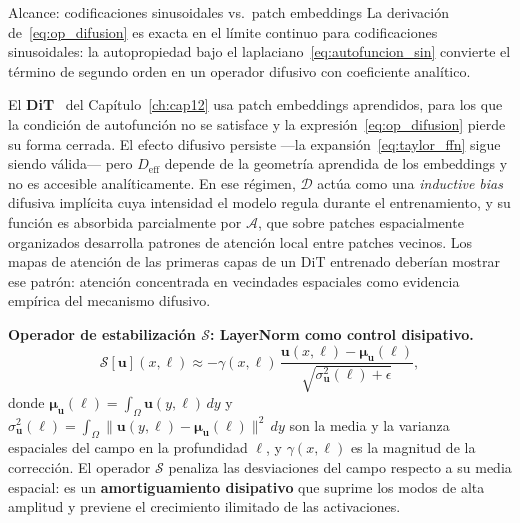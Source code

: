 \begin{observacion}{Alcance: codificaciones sinusoidales
vs.\ patch embeddings}
\label{obs:difusion_alcance}
La derivación de~\eqref{eq:op_difusion} es exacta en el límite
continuo para codificaciones sinusoidales: la autopropiedad
bajo el laplaciano~\eqref{eq:autofuncion_sin} convierte el
término de segundo orden en un operador difusivo con coeficiente
analítico.

El \textbf{DiT}~\cite{peebles2023dit} del Capítulo~\ref{ch:cap12}
usa patch embeddings aprendidos, para los que la condición de
autofunción no se satisface y la expresión~\eqref{eq:op_difusion}
pierde su forma cerrada. El efecto difusivo persiste
—la expansión~\eqref{eq:taylor_ffn} sigue siendo válida— pero
$D_{\mathrm{eff}}$ depende de la geometría aprendida de los
embeddings y no es accesible analíticamente. En ese régimen,
$\mathcal{D}$ actúa como una \emph{inductive bias} difusiva
implícita cuya intensidad el modelo regula durante el
entrenamiento, y su función es absorbida parcialmente por
$\mathcal{A}$, que sobre patches espacialmente organizados
desarrolla patrones de atención local entre patches vecinos.
Los mapas de atención de las primeras capas de un DiT entrenado
deberían mostrar ese patrón: atención concentrada en vecindades
espaciales como evidencia empírica del mecanismo difusivo.
\end{observacion}

\medskip
\noindent\textbf{Operador de estabilización $\mathcal{S}$:
LayerNorm como control disipativo.}
\begin{equation}
  \mathcal{S}[\bm{u}](x,\ell)
  \approx -\gamma(x,\ell)\,
  \frac{\bm{u}(x,\ell) - \bm{\mu}_{\bm{u}}(\ell)}
  {\sqrt{\sigma^2_{\bm{u}}(\ell) + \epsilon}},
  \label{eq:op_estab}
\end{equation}
donde $\bm{\mu}_{\bm{u}}(\ell) = \int_\Omega \bm{u}(y,\ell)\,dy$
y $\sigma^2_{\bm{u}}(\ell) = \int_\Omega
\|\bm{u}(y,\ell)-\bm{\mu}_{\bm{u}}(\ell)\|^2\,dy$ son la media y
la varianza espaciales del campo en la profundidad $\ell$, y
$\gamma(x,\ell)$ es la magnitud de la corrección. El operador
$\mathcal{S}$ penaliza las desviaciones del campo respecto a su
media espacial: es un \textbf{amortiguamiento disipativo} que
suprime los modos de alta amplitud y previene el crecimiento
ilimitado de las activaciones.

